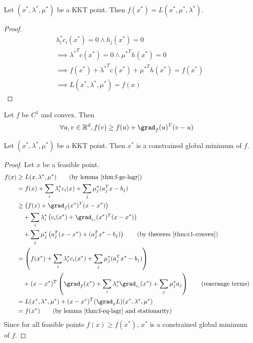 \begin{lemma}
\label{thm:f-eq-lagr}
Let $(x^*, \lambda^*, \mu^*)$ be a KKT point.
Then $f(x^*) = L(x^*, \mu^*, \lambda^*)$.
\end{lemma}
\begin{proof}
\begin{align*}
& \lambda_i^*c_i(x^*) = 0 \wedge h_j(x^*) = 0 \tag{complementary slackness and primal feasibility}
\\ &\implies {\lambda^*}^Tc(x^*) = 0 \wedge {\mu^*}^Th(x^*) = 0
\\ &\implies f(x^*) + {\lambda^*}^Tc(x^*) + {\mu^*}^Th(x^*) = f(x^*)
\\ &\implies L(x^*, \lambda^*, \mu^*) = f(x)
\end{align*}
\end{proof}

\begin{theorem}
\label{thm:c1-convex}
Let $f$ be $C^1$ and convex. Then
\[ \forall u, v \in \mathbb{R}^d, f(v) \ge f(u) + \grad_f(u)^T(v-u) \]
\end{theorem}

\begin{theorem}
Let $(x^*, \lambda^*, \mu^*)$ be a KKT point.
Then $x^*$ is a constrained global minimum of $f$.
\end{theorem}
\begin{proof}
Let $x$ be a feasible point.
\begin{align*}
f(x) &\ge L(x, \lambda^*, \mu^*) \tag{by lemma \ref{thm:f-ge-lagr}}
\\ &= f(x) + \sum_i \lambda_i^*c_i(x) + \sum_j \mu_j^*(a_j^Tx - b_j)
\\ &\ge \left(f(x) + \grad_f(x^*)^T(x-x^*)\right)
\\ &\quad + \sum_i \lambda_i^* \left( c_i(x^*) + \grad_{c_i}(x^*)^T(x-x^*) \right)
\\ &\quad + \sum_j \mu_j^* \left( a_j^T(x - x^*) + (a_j^Tx^* - b_j) \right)
\tag{by theorem \ref{thm:c1-convex}}
\\ &= \left( f(x^*) + \sum_i \lambda_i^*c_i(x^*) + \sum_j \mu_j^*(a_j^Tx^* - b_j) \right)
\\ &\quad + (x-x^*)^T\left( \grad_f(x^*) + \sum_i \lambda_i^* \grad_{c_i}(x^*) + \sum_j \mu_j^*a_j \right)
\tag{rearrange terms}
\\ &= L(x^*, \lambda^*, \mu^*) + (x-x^*)^T (\grad_xL)(x^*, \lambda^*, \mu^*)
\\ &= f(x^*) \tag{by lemma \ref{thm:f-eq-lagr} and stationarity}
\end{align*}
Since for all feasible points $f(x) \ge f(x^*)$, $x^*$ is a constrained global minimum of $f$.
\end{proof}

